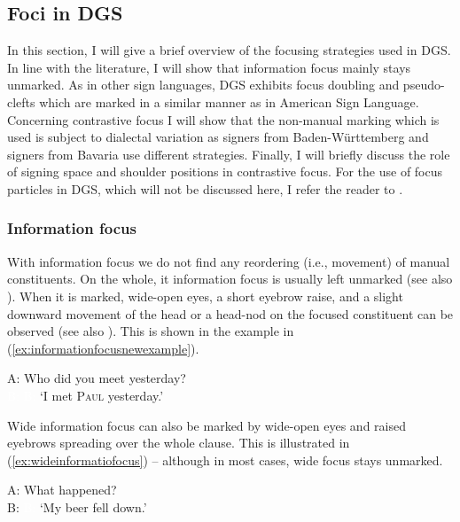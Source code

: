 \subsection{Foci in DGS}
In this section, I will give a brief overview of the focusing strategies used in DGS. In line with the literature, I will show that information focus mainly stays unmarked. As in other sign languages, DGS exhibits focus doubling and pseudo-clefts which are marked in a similar manner as in American Sign Language. Concerning contrastive focus I will show that the non-manual marking which is used is subject to dialectal variation as signers from Baden-Württemberg and signers from Bavaria use different strategies. Finally, I will briefly discuss the role of signing space and shoulder positions in contrastive focus. For the use of focus particles in DGS, which will not be discussed here, I refer the reader to \citet{herrmann2013modal}.

\subsubsection{Information focus}
With information focus we do not find any reordering (i.e., movement) of manual constituents. On the whole, it information focus is usually left unmarked (see also \citealt{waleschkowski2009}). When it is marked, wide-open eyes, a short eyebrow raise, and a slight downward movement of the head or a head-nod on the focused constituent can be observed (see also \citealt[396]{happ2014vork}). This is shown in the example in (\ref{ex:informationfocusnewexample}).

\begin{exe}
\ex\label{ex:informationfocusnewexample}
A: Who did you meet yesterday?\\
\textcolor{white}{B: }  
\glt \textcolor{white}{B: }`I met \textsc{Paul} yesterday.' 
\end{exe}

\noindent Wide information focus can also be marked by wide-open eyes and raised eyebrows spreading over the whole clause. This is illustrated in (\ref{ex:wideinformatiofocus}) -- although in most cases, wide focus stays unmarked. %

\begin{exe}
\ex
A: What happened? \\
B: 
%
\glt \textcolor{white}{B: }`My beer fell down.' \label{ex:wideinformatiofocus}

\end{exe}

